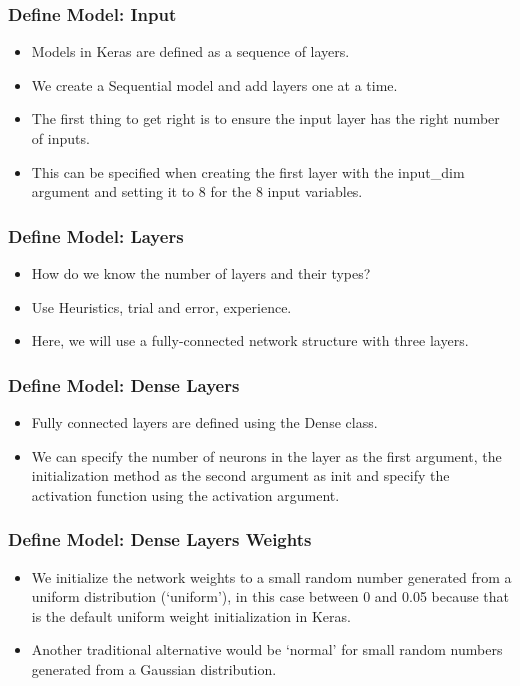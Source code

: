 \begin{frame}[fragile] \frametitle{Define Model: Input}
 \begin{itemize}
\item  Models in Keras are defined as a sequence of layers.
\item We create a Sequential model and add layers one at a time.
\item The first thing to get right is to ensure the input layer has the right number of inputs. 
\item This can be specified when creating the first layer with the input\_dim argument and setting it to 8 for the 8 input variables.
\end{itemize}
\end{frame}

\begin{frame}[fragile] \frametitle{Define Model: Layers}
 \begin{itemize}
\item  How do we know the number of layers and their types?
\item Use Heuristics, trial and error, experience.
\item Here, we will use a fully-connected network structure with three layers.

\end{itemize}
\end{frame}


\begin{frame}[fragile] \frametitle{Define Model: Dense Layers}
 \begin{itemize}
\item  Fully connected layers are defined using the Dense class. 
\item We can specify the number of neurons in the layer as the first argument, the initialization method as the second argument as init and specify the activation function using the activation argument.
\end{itemize}
\end{frame}


\begin{frame}[fragile] \frametitle{Define Model: Dense Layers Weights}
 \begin{itemize}
\item  We initialize the network weights to a small random number generated from a uniform distribution (`uniform'), in this case between 0 and 0.05 because that is the default uniform weight initialization in Keras. 
\item Another traditional alternative would be `normal' for small random numbers generated from a Gaussian distribution.
\end{itemize}
\end{frame}

